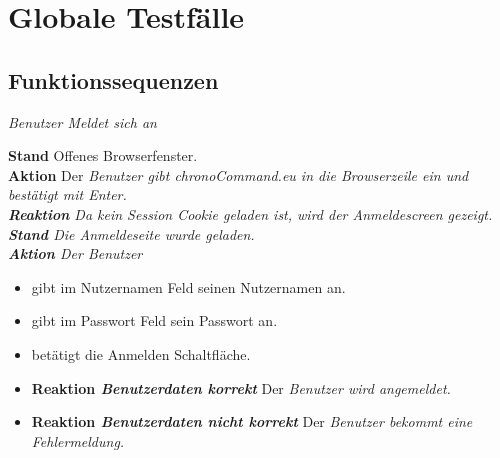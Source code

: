 \section{Globale Testfälle}

\subsection{Funktionssequenzen}
\begin{requirements}
	 \em{Benutzer} Meldet sich an
	\begin{requirements}
  			    \textbf{Stand} Offenes Browserfenster. \\
  			    \textbf{Aktion} Der \em{Benutzer} gibt chronoCommand.eu in die Browserzeile ein und bestätigt mit Enter. \\
  			    \textbf{Reaktion} Da kein Session Cookie geladen ist, wird der Anmeldescreen gezeigt.
  			    \textbf{Stand} Die Anmeldeseite wurde geladen.\\
                \textbf{Aktion} Der \em{Benutzer}
                    \begin{itemize}
                        \item gibt im Nutzernamen Feld seinen Nutzernamen an.
                        \item gibt im Passwort Feld sein Passwort an.
                        \item betätigt die Anmelden Schaltfläche.
                    \end{itemize}
                \begin{itemize}
			\item \textbf{Reaktion \em{Benutzerdaten korrekt}} Der \em{Benutzer} wird angemeldet.
			\item \textbf{Reaktion \em{Benutzerdaten nicht korrekt}} Der \em{Benutzer} bekommt eine Fehlermeldung.
                \end{itemize}


\end{requirements}
\end{requirements}
